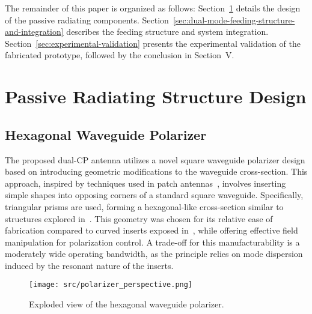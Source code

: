 \documentclass[journal]{IEEEtran}
\begin{document}
The remainder of this paper is organized as follows: Section~\ref{sec:passive-radiating-structure-design} details the design of the passive radiating components. Section~\ref{sec:dual-mode-feeding-structure-and-integration} describes the feeding structure and system integration. Section~\ref{sec:experimental-validation} presents the experimental validation of the fabricated prototype, followed by the conclusion in Section~V.


\section{Passive Radiating Structure Design}
\label{sec:passive-radiating-structure-design}

\subsection{Hexagonal Waveguide Polarizer}
\label{subsec:hexagonal-waveguide-polarizer}

The proposed dual-CP antenna utilizes a novel square waveguide polarizer design based on introducing geometric modifications to the waveguide cross-section. This approach, inspired by techniques used in patch antennas~\cite{armin-et-al:modification-of-a-2g2hz-sband-rectangular-patch-microstrip-antenna-using-truncated-corner-method-for-satellite-applications}, involves inserting simple shapes into opposing corners of a standard square waveguide. Specifically, triangular prisms are used, forming a hexagonal-like cross-section similar to structures explored in~\cite{bhardwaj-volakis:hexagonal-waveguides-new-class-of-waveguides-for-mmwave-circularly-polarized-horns}. This geometry was chosen for its relative ease of fabrication compared to curved inserts exposed in~\cite{garcia-marin-masa-campos:bowtie-shaped-radiating-element-for-single-and-dual-circular-polarization}, while offering effective field manipulation for polarization control. A trade-off for this manufacturability is a moderately wide operating bandwidth, as the principle relies on mode dispersion induced by the resonant nature of the inserts.

\begin{figure}[!ht]
    \centering
    \texttt{[image: src/polarizer\_perspective.png]}
    \caption{\label{fig:polarizer-perspective}Exploded view of the hexagonal waveguide polarizer.}
\end{figure}
\end{document}
